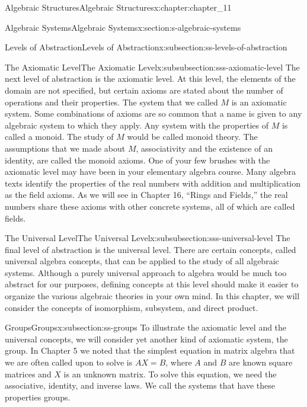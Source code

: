 \documentclass[oneside,10pt,]{book}
\numberwithin{equation}{section}
\begin{document}
\begin{chapterptx}{Algebraic Structures}{}{Algebraic Structures}{}{}{x:chapter:chapter_11}
\begin{sectionptx}{Algebraic Systems}{}{Algebraic Systems}{}{}{x:section:s-algebraic-systems}
\begin{subsectionptx}{Levels of Abstraction}{}{Levels of Abstraction}{}{}{x:subsection:ss-levels-of-abstraction}
\begin{subsubsectionptx}{The Axiomatic Level}{}{The Axiomatic Level}{}{}{x:subsubsection:sss-axiomatic-level}
The next level of abstraction is the axiomatic level. At this level, the elements of the domain are not specified, but certain axioms are stated about the number of operations and their properties. The system that we called \(M\) is an axiomatic system. Some combinations of axioms are so common that a name is given to any algebraic system  to which they apply. Any system with the properties of \(M\) is called a monoid. The study of \(M\) would be called monoid theory. The assumptions that we made about \(M\), associativity and the existence of an identity, are called the monoid axioms. One of your few brushes with the axiomatic level may have been in your elementary algebra course. Many algebra texts identify the properties of the real numbers with addition and multiplication as the field axioms. As we will see in Chapter 16, ``Rings and Fields,'' the real numbers share these axioms with other concrete systems, all of which are called fields.%
\end{subsubsectionptx}
%
%
\typeout{************************************************}
\typeout{************************************************}
%
\begin{subsubsectionptx}{The Universal Level}{}{The Universal Level}{}{}{x:subsubsection:sss-universal-level}
The final level of abstraction is the universal level. There are certain concepts, called universal algebra concepts, that can be applied to the study of all algebraic systems. Although a purely universal approach to algebra would be much too abstract for our purposes, defining concepts at this level should make it easier to organize the various algebraic theories in your own mind. In this chapter, we will consider the concepts of isomorphism, subsystem, and direct product.%
\end{subsubsectionptx}
\end{subsectionptx}
%
%
\typeout{************************************************}
\typeout{************************************************}
%
\begin{subsectionptx}{Groups}{}{Groups}{}{}{x:subsection:ss-groups}
To illustrate the axiomatic level and the universal concepts, we will consider yet another kind of axiomatic system, the group. In Chapter 5 we noted that the simplest equation in matrix algebra that we are often called upon to solve is \(A X = B\), where \(A\) and \(B\) are known square matrices and \(X\) is an unknown matrix. To solve this equation, we need the associative, identity, and inverse laws. We call the systems that have these properties groups.%

\end{subsectionptx}
\end{sectionptx}
\end{chapterptx}
\end{document}
